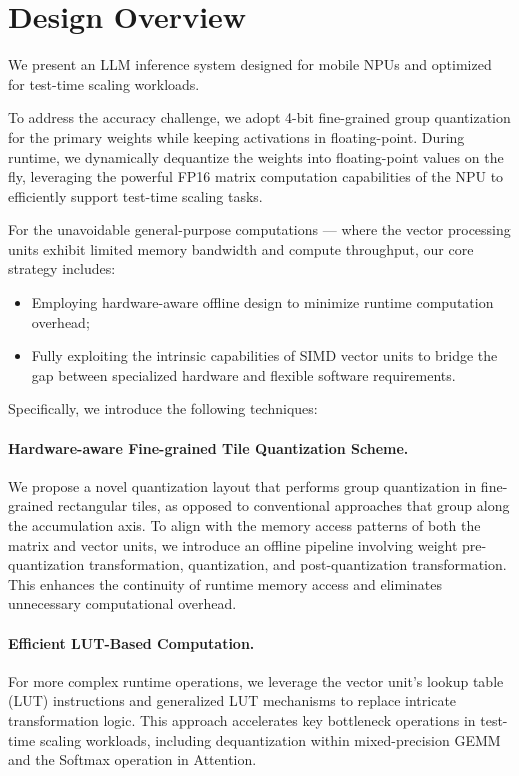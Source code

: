 \section{Design Overview}

We present an LLM inference system designed for mobile NPUs and optimized for test-time scaling workloads.

To address the accuracy challenge, we adopt 4-bit fine-grained group quantization for the primary weights while keeping activations in floating-point. During runtime, we dynamically dequantize the weights into floating-point values on the fly, leveraging the powerful FP16 matrix computation capabilities of the NPU to efficiently support test-time scaling tasks.

For the unavoidable general-purpose computations — where the vector processing units exhibit limited memory bandwidth and compute throughput, our core strategy includes:

\begin{itemize}
    \item Employing hardware-aware offline design to minimize runtime computation overhead;
    \item Fully exploiting the intrinsic capabilities of SIMD vector units to bridge the gap between specialized hardware and flexible software requirements.
\end{itemize}

Specifically, we introduce the following techniques:

\paragraph{Hardware-aware Fine-grained Tile Quantization Scheme.} We propose a novel quantization layout that performs group quantization in fine-grained rectangular tiles, as opposed to conventional approaches that group along the accumulation axis. To align with the memory access patterns of both the matrix and vector units, we introduce an offline pipeline involving weight pre-quantization transformation, quantization, and post-quantization transformation. This enhances the continuity of runtime memory access and eliminates unnecessary computational overhead.

\paragraph{Efficient LUT-Based Computation.} For more complex runtime operations, we leverage the vector unit’s lookup table (LUT) instructions and generalized LUT mechanisms to replace intricate transformation logic. This approach accelerates key bottleneck operations in test-time scaling workloads, including dequantization within mixed-precision GEMM and the Softmax operation in Attention.

